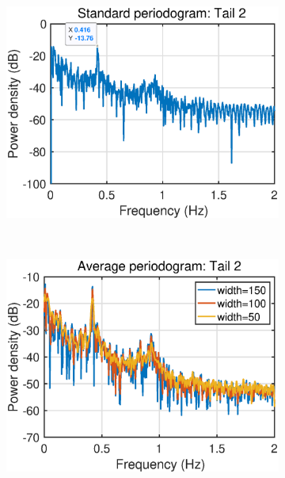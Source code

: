 \begin{figure}[htb]
\begin{subfigure}{0.4\textwidth}
     \end{subfigure}
     ~
     \begin{subfigure}{0.4\textwidth}
         \centering
         \includegraphics[width=\textwidth]{fig/15/15a3.eps}
     \end{subfigure}
     ~
     \begin{subfigure}{0.4\textwidth}
         \centering
         \includegraphics[width=\textwidth]{fig/15/15a4.eps}
     \end{subfigure}
     ~
     \begin{subfigure}{0.4\textwidth}
         \centering

\end{subfigure}
\end{figure}
